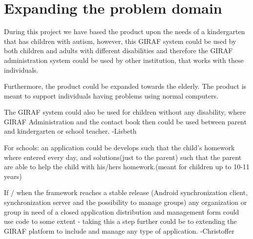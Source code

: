 \section{Expanding the problem domain}


During this project we have based the product upon the needs of a kindergarten that has children with autism, however, this GIRAF system could be used by both children and adults with different disabilities and therefore the GIRAF administration system could be used by other institution, that works with these individuals. 

Furthermore, the product could be expanded towards the elderly. The product is meant to support individuals having problems using normal computers.  

The GIRAF system could also be used for children without any disability, where GIRAF Administration and the contact book then could be used between parent and kindergarten or school teacher. -Lisbeth

For schools: an application could be develops such that the child's homework where entered every day, and solutions(just to the parent) such that the parent are able to help the child with his/hers homework.(meant for children up to 10-11 years) 

If / when the framework reaches a stable release (Android synchronization client, synchronization server and the possibility to manage groups) any organization or group in need of a closed application distribution and management form could use code to some extent - taking this a step further could be to extending the GIRAF platform to include and manage any type of application. -Christoffer

    